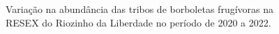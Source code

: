 \documentclass[
  letterpaper,
]{scrbook}
\begin{document}
\begin{figure}[H]


\caption{\label{fig-abundancia-resex-riozinho-liberdade}Variação na
abundância das tribos de borboletas frugívoras na RESEX do Riozinho da
Liberdade no período de 2020 a 2022.}

\end{figure}%
\end{document}
